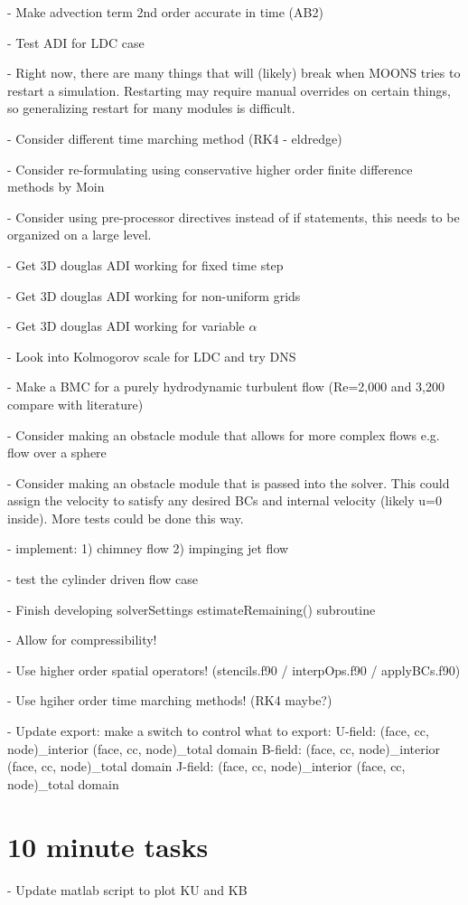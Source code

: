 \documentclass[11pt]{article}
\begin{document}
- Make advection term 2nd order accurate in time (AB2)

- Test ADI for LDC case

- Right now, there are many things that will (likely) break when MOONS tries to restart a simulation. Restarting may require manual overrides on certain things, so generalizing restart for many modules is difficult.

- Consider different time marching method (RK4 - eldredge)

- Consider re-formulating using conservative higher order finite difference methods by Moin

- Consider using pre-processor directives instead of if statements, this needs to be organized on a large level.

- Get 3D douglas ADI working for fixed time step

- Get 3D douglas ADI working for non-uniform grids

- Get 3D douglas ADI working for variable $\alpha$

- Look into Kolmogorov scale for LDC and try DNS

- Make a BMC for a purely hydrodynamic turbulent flow (Re=2,000 and 3,200 compare with literature)

- Consider making an obstacle module that allows for more complex flows
e.g. flow over a sphere

- Consider making an obstacle module that is passed into the solver.
This could assign the velocity to satisfy any desired BCs and internal
velocity (likely u=0 inside). More tests could be done this way.

- implement: 1) chimney flow 2) impinging jet flow

- test the cylinder driven flow case

- Finish developing solverSettings estimateRemaining() subroutine

- Allow for compressibility!

- Use higher order spatial operators! (stencils.f90 / interpOps.f90 / applyBCs.f90)

- Use hgiher order time marching methods! (RK4 maybe?)

- Update export: make a switch to control what to export:
      U-field: (face, cc, node)\_interior (face, cc, node)\_total domain
      B-field: (face, cc, node)\_interior (face, cc, node)\_total domain
      J-field: (face, cc, node)\_interior (face, cc, node)\_total domain

\section{10 minute tasks}
- Update matlab script to plot KU and KB
\end{document}
